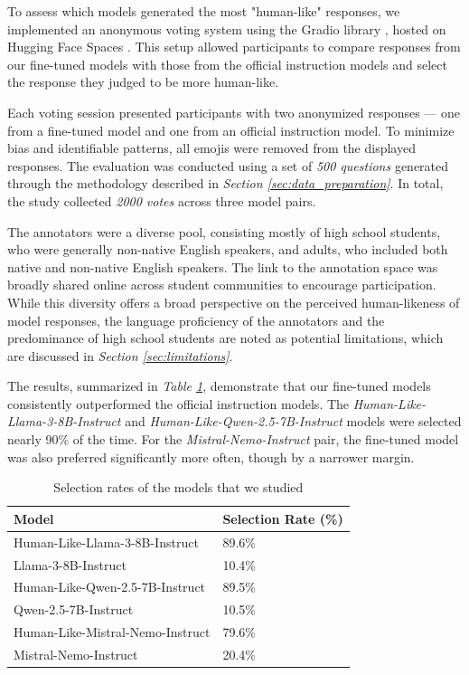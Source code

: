 \documentclass{article}
\begin{document}
To assess which models generated the most "human-like" responses, we implemented an anonymous voting system using the Gradio library \cite{abid2019gradiohasslefreesharingtesting}, hosted on Hugging Face Spaces \cite{hf_spaces}. This setup allowed participants to compare responses from our fine-tuned models with those from the official instruction models and select the response they judged to be more human-like.

Each voting session presented participants with two anonymized responses — one from a fine-tuned model and one from an official instruction model. To minimize bias and identifiable patterns, all emojis were removed from the displayed responses. The evaluation was conducted using a set of \textit{500 questions} generated through the methodology described in \textit{Section \ref{sec:data_preparation}}. In total, the study collected \textit{2000 votes} across three model pairs.

The annotators were a diverse pool, consisting mostly of high school students, who were generally non-native English speakers, and adults, who included both native and non-native English speakers. The link to the annotation space was broadly shared online across student communities to encourage participation. While this diversity offers a broad perspective on the perceived human-likeness of model responses, the language proficiency of the annotators and the predominance of high school students are noted as potential limitations, which are discussed in \textit{Section \ref{sec:limitations}}.

The results, summarized in \textit{Table \ref{table:human_likeness_performance_percent}}, demonstrate that our fine-tuned models consistently outperformed the official instruction models. The \textit{Human-Like-Llama-3-8B-Instruct} and\textit{ Human-Like-Qwen-2.5-7B-Instruct} models were selected nearly 90\% of the time. For the \textit{Mistral-Nemo-Instruct} pair, the fine-tuned model was also preferred significantly more often, though by a narrower margin.

\begin{table}[h!]
\centering
\begin{tabular}{p{8cm} p{5cm}}
\toprule
\textbf{Model} & \textbf{Selection Rate (\%)} \\
\midrule
Human-Like-Llama-3-8B-Instruct & 89.6\% \\
Llama-3-8B-Instruct & 10.4\% \\
\midrule
Human-Like-Qwen-2.5-7B-Instruct & 89.5\% \\
Qwen-2.5-7B-Instruct & 10.5\% \\
\midrule
Human-Like-Mistral-Nemo-Instruct & 79.6\% \\
Mistral-Nemo-Instruct & 20.4\% \\
\bottomrule
\end{tabular}
\vspace{0.3cm}
\caption{Selection rates of the models that we studied}
\label{table:human_likeness_performance_percent}
\end{table}
\end{document}
